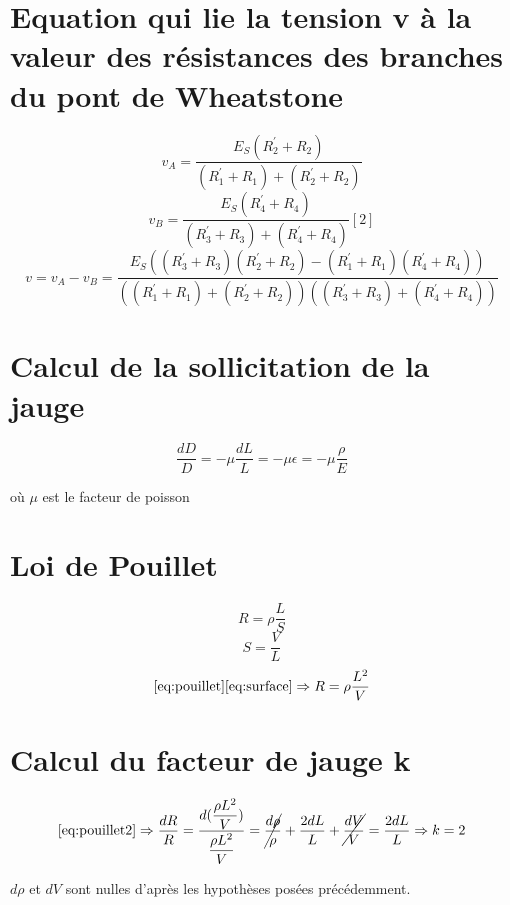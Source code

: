 \documentclass[10pt,a4paper]{report}
\begin{document}
\section*{Equation  qui lie la tension v à la valeur des résistances des branches du pont de Wheatstone}
\begin{equation}v_{A} = \dfrac{E_{S}(R^{'}_{2}+R_{2})}{(R^{'}_{1}+R_{1})+(R^{'}_{2}+R_{2})}\end{equation} 
\begin{equation}v_{B} = \dfrac{E_{S}(R^{'}_{4}+R_{4})}{(R^{'}_{3}+R_{3})+(R^{'}_{4}+R_{4})} [2]\end{equation} 
\begin{equation}
v = v_{A} - v_{B} = \dfrac{E_{S}((R^{'}_{3}+R_{3})(R^{'}_{2}+R_{2})-(R^{'}_{1}+R_{1})(R^{'}_{4}+R_{4}))}{((R^{'}_{1}+R_{1})+(R^{'}_{2}+R_{2}))((R^{'}_{3}+R_{3})+(R^{'}_{4}+R_{4}))} \end{equation} 

\section*{Calcul de la sollicitation de la jauge}
\begin{equation}
\label{eq:poisson}
\dfrac{dD}{D} = - \mu \dfrac{dL}{L} = - \mu \epsilon =  - \mu \dfrac{\rho}{E}
\end{equation}
\begin{center}où $\mu$ est le facteur de poisson\end{center}
\section*{Loi de Pouillet}
\begin{equation}
\label{eq:pouillet}
R = \rho \dfrac{L}{S}
\end{equation}
\begin{equation}
\label{eq:surface}
 S  = \dfrac{V}{L} 
\end{equation}
\begin{equation}
\label{eq:pouillet2}
\eqref{eq:pouillet}\eqref{eq:surface} \Rightarrow  R = \rho \dfrac{L^{2}}{V}
 \end{equation}
\section*{Calcul du facteur de jauge k}
\begin{equation}
\eqref{eq:pouillet2} \Rightarrow \dfrac{dR}{R} = \dfrac{d(\dfrac{\rho L^{2}}{V})}{\dfrac{\rho L^{2}}{V}} =  \cancel{\dfrac{d\rho}{\rho}}+ \dfrac{2dL}{L}+\cancel{\dfrac{dV}{V}}  =  \dfrac{2dL}{L} \Rightarrow k = 2
\end{equation}
\begin{center}$d\rho$ et $dV$ sont nulles d'après les hypothèses posées précédemment.\end{center}
\end{document}
